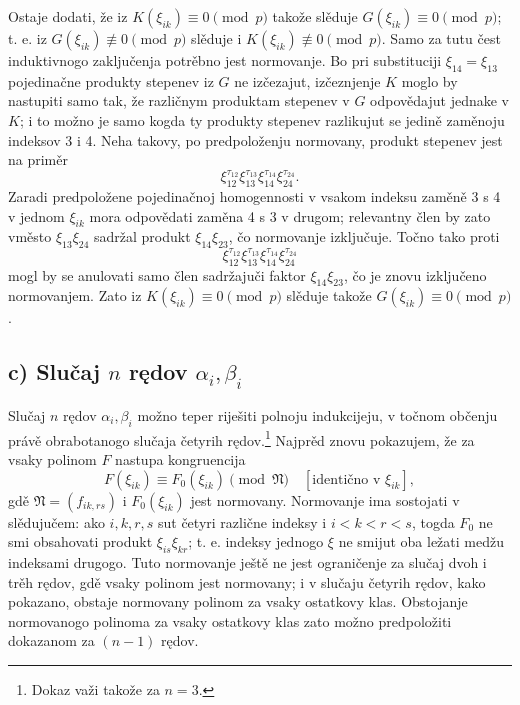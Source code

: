 \documentclass[11pt]{article}
\providecommand{\frN}{\mathfrak N}
\begin{document}
Ostaje dodati, že iz \(K(\xi_{ik})\equiv0\pmod p\) takože slěduje \(G(\xi_{ik})\equiv0\pmod p\); t. e. iz \(G(\xi_{ik})\not\equiv0\pmod p\) slěduje i \(K(\xi_{ik})\not\equiv0\pmod p\). Samo za tutu čest induktivnogo zaključenja potrěbno jest normovanje. Bo pri substituciji \(\xi_{14}=\xi_{13}\) pojedinačne produkty stepenev iz \(G\) ne izčezajut, izčeznjenje \(K\) moglo by nastupiti samo tak, že različnym produktam stepenev v \(G\) odpovědajut jednake v \(K\); i to možno je samo kogda ty produkty stepenev razlikujut se jedině zaměnoju indeksov 3 i 4. Neha takovy, po predpoloženju normovany, produkt stepenev jest na priměr
\[
        \xi_{12}^{\tau_{12}}\xi_{13}^{\tau_{13}}\xi_{14}^{\tau_{14}}\xi_{24}^{\tau_{24}}.
\]
Zaradi predpoložene pojedinačnoj homogennosti v vsakom indeksu zaměně 3 s 4 v jednom \(\xi_{ik}\) mora odpovědati zaměna 4 s 3 v drugom; relevantny člen by zato vměsto \(\xi_{13}\xi_{24}\) sadržal produkt \(\xi_{14}\xi_{23}\), čo normovanje izključuje. Točno tako proti
\[
        \xi_{12}^{\tau_{12}}\xi_{13}^{\tau_{13}}\xi_{14}^{\tau_{14}}\xi_{24}^{\tau_{24}}
\]
mogl by se anulovati samo člen sadržajuči faktor \(\xi_{14}\xi_{23}\), čo je znovu izključeno normovanjem. Zato iz \(K(\xi_{ik})\equiv0\pmod p\) slěduje takože \(G(\xi_{ik})\equiv0\pmod p\).

\subsection*{c) Slučaj \(n\) rędov \(\alpha_i,\beta_i\)}

Slučaj \(n\) rędov \(\alpha_i,\beta_i\) možno teper riješiti polnoju indukcijeju, v točnom občenju právě obrabotanogo slučaja četyrih rędov.\footnote{Dokaz važi takože za \(n=3\).}
Najprěd znovu pokazujem, že za vsaky polinom \(F\) nastupa kongruencija
\begin{equation}
        F(\xi_{ik})\equiv F_0(\xi_{ik})\pmod{\frN}\quad [\text{identično v \(\xi_{ik}\)}],
\end{equation}
gdě \(\frN=(f_{ik,rs})\) i \(F_0(\xi_{ik})\) jest normovany. Normovanje ima sostojati v slědujučem: ako \(i,k,r,s\) sut četyri različne indeksy i \(i<k<r<s\), togda \(F_0\) ne smi obsahovati produkt \(\xi_{is}\xi_{kr}\); t. e. indeksy jednogo \(\xi\) ne smijut oba ležati medžu indeksami drugogo. Tuto normovanje ještě ne jest ograničenje za slučaj dvoh i trěh rędov, gdě vsaky polinom jest normovany; i v slučaju četyrih rędov, kako pokazano, obstaje normovany polinom za vsaky ostatkovy klas. Obstojanje normovanogo polinoma za vsaky ostatkovy klas zato možno predpoložiti dokazanom za \((n-1)\) rędov.
\end{document}
